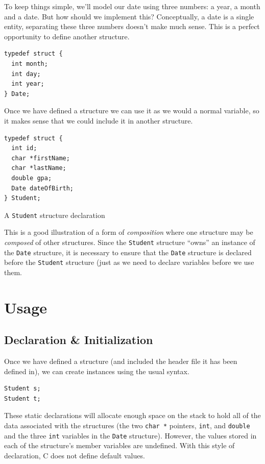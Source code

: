 To keep things simple, we'll model our date using three numbers: a
year, a month and a date.  But how should we implement this?  
Conceptually, a date is a single entity, separating these three 
numbers doesn't make much sense.  This is a perfect opportunity to 
define another structure.

\begin{verbatim}
typedef struct {
  int month;
  int day;
  int year;
} Date;
\end{verbatim}

Once we have defined a structure we can use it as we would a normal
variable, so it makes sense that we could include it in another structure.

\begin{listing}
\centering
\begin{verbatim}
typedef struct {
  int id;
  char *firstName;
  char *lastName;
  double gpa;
  Date dateOfBirth;
} Student;
\end{verbatim}
\caption{A \texttt{Student} structure declaration}
\label{code:c:studentStructure}
\end{listing}

This is a good illustration of a form of  
\emph{composition} where 
one structure may be \emph{composed} of other structures.  Since
the \texttt{Student} structure ``owns'' an instance of the
\texttt{Date} structure, it is necessary to ensure that 
the \texttt{Date} structure is declared before the 
\texttt{Student} structure (just as we need to declare 
variables before we use them.

\section{Usage}

\subsection{Declaration \& Initialization}

Once we have defined a structure (and included the header file
it has been defined in), we can create instances using the usual
syntax.

\begin{verbatim}
Student s;
Student t;
\end{verbatim}

These static declarations will allocate enough space on the stack
to hold all of the data associated with the structures (the two
\texttt{char *} pointers, \texttt{int}, and 
\texttt{double} and the three \texttt{int} variables
in the \texttt{Date} structure).  However, the values stored in 
each of the structure's member variables are undefined.  With
this style of declaration, C does not define default values.

